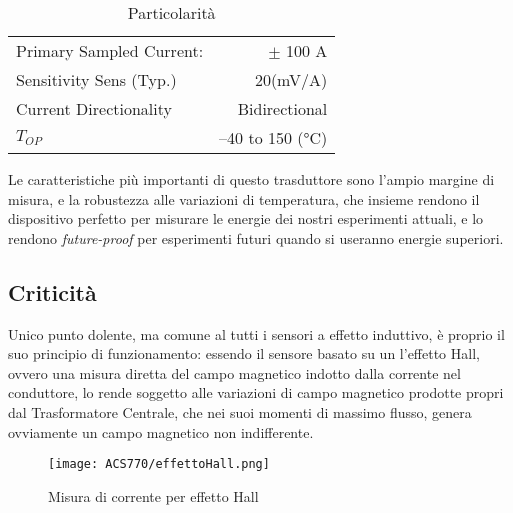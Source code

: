 \begin{table}[H]
	\centering
	\label{tab:ACS770ParametriParticolari}
	\caption[ Particolarità]{ Particolarità}
	\begin{tabular}[t]{|l r|}
		\hline
		Primary Sampled Current: & $\pm$ 100 A     \\
		Sensitivity Sens (Typ.)  & 20(mV/A)        \\
		Current Directionality   & Bidirectional   \\
		$T_{OP}$                 & –40 to 150 (°C) \\
		\hline
	\end{tabular}
	
\end{table}
\noindent
Le caratteristiche più importanti di questo trasduttore sono l'ampio margine di misura, e la robustezza alle variazioni di temperatura, che insieme rendono il dispositivo perfetto per misurare le energie dei nostri esperimenti attuali, e lo rendono \textit{future-proof} per esperimenti futuri quando si useranno energie superiori.

\subsection{Criticità}
Unico punto dolente, ma comune al tutti i sensori a effetto induttivo, è proprio il suo principio di funzionamento: essendo il sensore basato su un l'effetto Hall, ovvero una misura diretta del campo magnetico indotto dalla corrente nel conduttore, lo rende soggetto alle variazioni di campo magnetico prodotte propri dal Trasformatore Centrale, che nei suoi momenti di massimo flusso, genera ovviamente un campo magnetico non indifferente.
\begin{figure}[H]
	\centering
	\caption[Metodo di misura di corrente mediante effetto Hall]{Misura di corrente per effetto Hall}
	\texttt{[image: ACS770/effettoHall.png]}
\end{figure}
\newpage
